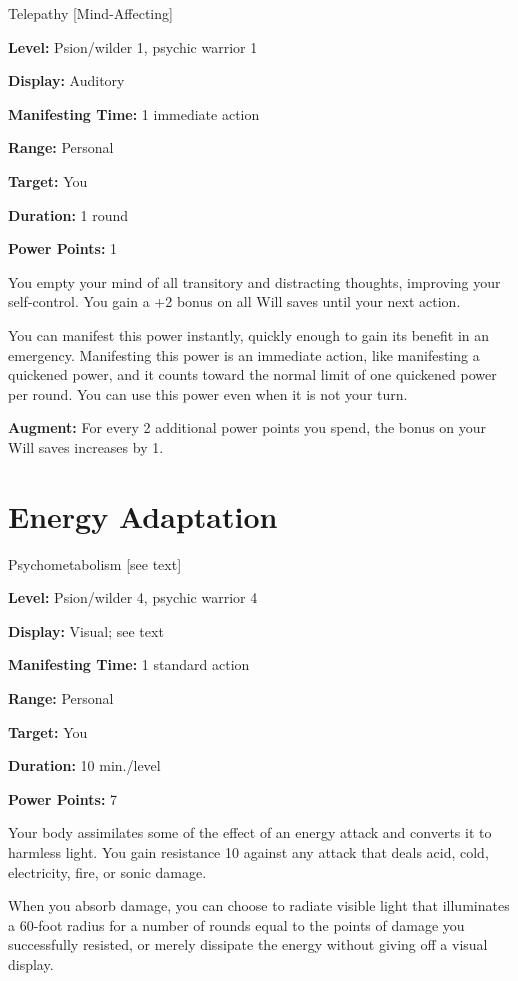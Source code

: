 \documentclass{article}
\begin{document}
Telepathy [Mind-Affecting]

\textbf{Level:} Psion/wilder 1, psychic warrior 1

\textbf{Display:} Auditory

\textbf{Manifesting Time:} 1 immediate action

\textbf{Range:} Personal

\textbf{Target:} You

\textbf{Duration:} 1 round

\textbf{Power Points:} 1

You empty your mind of all transitory and distracting thoughts, improving your 
self-control. You gain a +2 bonus on all Will saves until your next action.

You can manifest this power instantly, quickly enough to gain its benefit in an 
emergency. Manifesting this power is an immediate action, like manifesting a quickened 
power, and it counts toward the normal limit of one quickened power per round. 
You can use this power even when it is not your turn.

\textbf{Augment:} For every 2 additional power points you spend, the bonus on your 
Will saves increases by 1.

\vspace{12pt}
\section*{Energy Adaptation}

Psychometabolism [see text]

\textbf{Level:} Psion/wilder 4, psychic warrior 4

\textbf{Display:} Visual; see text

\textbf{Manifesting Time:} 1 standard action

\textbf{Range:} Personal

\textbf{Target:} You

\textbf{Duration:} 10 min./level

\textbf{Power Points:} 7

Your body assimilates some of the effect of an energy attack and converts it to 
harmless light. You gain resistance 10 against any attack that deals acid, cold, 
electricity, fire, or sonic damage.

When you absorb damage, you can choose to radiate visible light that illuminates 
a 60-foot radius for a number of rounds equal to the points of damage you successfully 
resisted, or merely dissipate the energy without giving off a visual display.
\end{document}

